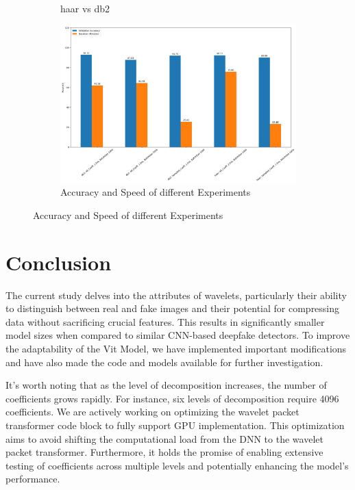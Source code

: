 \documentclass{svproc}
\begin{document}
\begin{figure}[H]
\begin{subfigure}{0.4\textwidth}
    \caption{haar vs db2}
    \label{fig:exp2_sub2}
  \end{subfigure}
  \begin{subfigure}{0.9\textwidth}
    \centering
    \includegraphics[width=0.9\linewidth]{figures/Compare_speed.png}
    \caption{Accuracy and Speed of different Experiments}
    \label{fig:exp_compare_speed}
  \end{subfigure}
  \label{fig:exp_compare_some}
\end{figure}


%
%

\section{Conclusion}
The current study delves into the attributes of wavelets, particularly their ability to distinguish between real and fake images and their potential for compressing data without sacrificing crucial features. This results in significantly smaller model sizes when compared to similar CNN-based deepfake detectors. To improve the adaptability of the Vit Model, we have implemented important modifications and have also made the code and models available for further investigation.

It's worth noting that as the level of decomposition increases, the number of coefficients grows rapidly. For instance, six levels of decomposition require 4096 coefficients. We are actively working on optimizing the wavelet packet transformer code block to fully support GPU implementation. This optimization aims to avoid shifting the computational load from the DNN to the wavelet packet transformer. Furthermore, it holds the promise of enabling extensive testing of coefficients across multiple levels and potentially enhancing the model's performance.
\end{document}
